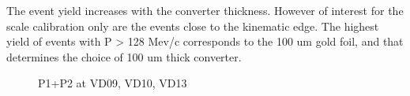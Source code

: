 The event yield increases with the converter thickness. However of interest for the scale calibration only
are the events close to the kinematic edge.
The highest yield of events with P > 128 Mev/c corresponds to the 100 um gold foil, and that determines
the choice of 100 um thick converter.

\begin{figure}[H]
  \caption{
    \label{figure:sum_mom_vd09_10_13}
    P1+P2 at VD09, VD10, VD13
  }
\end{figure}

